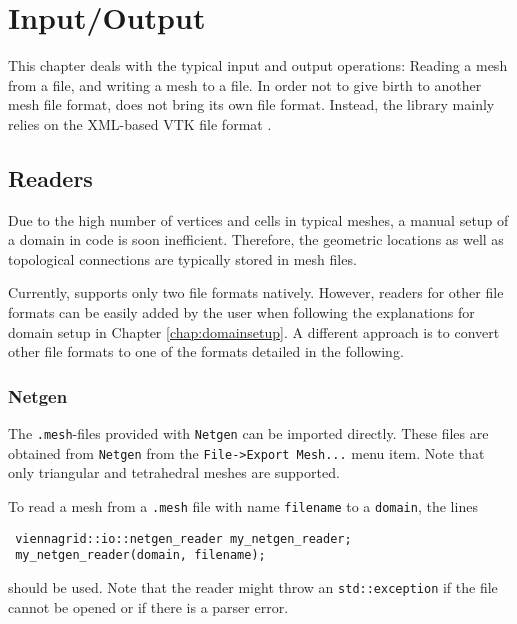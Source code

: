 \chapter{Input/Output} \label{chap:io}

 

This chapter deals with the typical input and output operations: Reading a mesh from a file, and writing a mesh to a file.
In order not to give birth to another mesh file format, {\ViennaGrid} does not bring its own file format. 
Instead, the library mainly relies on the XML-based VTK \cite{VTK} file format \cite{VTKfileformat}.




\section{Readers}
Due to the high number of vertices and cells in typical meshes,
a manual setup of a domain in code is soon inefficient. Therefore,
the geometric locations as well as topological connections are typically stored in mesh files.

Currently, {\ViennaGrid} supports only two file formats natively. However, readers for other file formats
can be easily added by the user when following the explanations for domain setup in Chapter \ref{chap:domainsetup}.
A different approach is to convert other file formats to one of the formats detailed in the following.


 \subsection{Netgen}
 The \texttt{.mesh}-files provided with \texttt{Netgen} \cite{netgen} can be imported directly.
 These files are obtained from \texttt{Netgen} from the \texttt{File->Export Mesh...} menu item. Note that only triangular and tetrahedral meshes are supported.

 To read a mesh from a \texttt{.mesh} file with name \lstinline|filename| to a \lstinline|domain|, the lines
 \begin{lstlisting}
 viennagrid::io::netgen_reader my_netgen_reader;
 my_netgen_reader(domain, filename);
 \end{lstlisting}
 should be used. Note that the reader might throw an \lstinline|std::exception| if the file cannot be opened or if there is a parser error.

